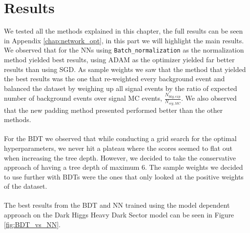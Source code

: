 \documentclass[12pt, a4paper]{book}
\begin{document}
\section{Results}
We tested all the methods explained in this chapter, the full results can be seen in Appendix \ref{chap:network_opt}, in this part we will highlight the main results. We observed that for the NNs using \verb|Batch_normalization| as the normalization method yielded best results, using ADAM as the optimizer yielded far better results than using SGD. 
As sample weights we saw that the method that yielded the best results was the one that re-weighted every background event and balanced the dataset by weighing up all signal events by the ratio of expected number of background events over signal MC events, $\frac{N_{bkg,exp}}{N_{sig,MC}}$. We also observed that the new padding method presented 
performed better than the other methods. \\
\\For the BDT we observed that while conducting a grid search for the optimal hyperparameters, we never hit a plateau where the scores seemed to flat out when increasing the tree depth. However, we decided to take the conservative approach of having a tree depth of maximum 6. The sample weights we decided to use further with BDTs were the ones 
that only looked at the positive weights of the dataset. \\
\\The best results from the BDT and NN trained using the model dependent approach on the Dark Higgs Heavy Dark Sector model can be seen in Figure \ref{fig:BDT_vs_NN}.
\newpage
\end{document}
